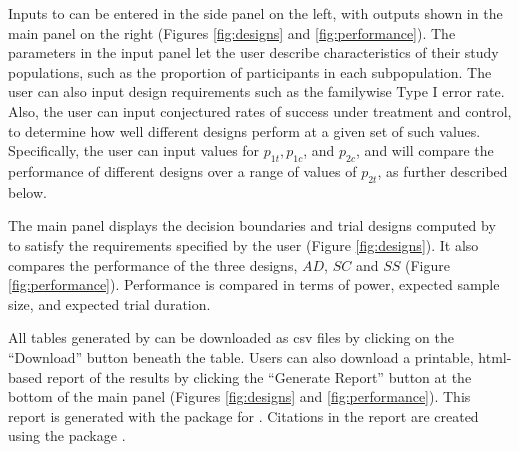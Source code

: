 \documentclass[article]{jss}
\begin{document}
Inputs to  can be entered in the side panel on the left, with outputs shown in the main panel on the right (Figures \ref{fig:designs} and \ref{fig:performance}). The parameters in the input panel let the user describe characteristics of their study populations, such as the proportion of participants in each subpopulation. 
The user can also input design requirements such as  the  familywise Type I error rate. Also, the user can input conjectured rates of success under treatment and control, to determine how well different designs perform at a given set of such values. Specifically, the user can input values for $p_{1t},p_{1c}$, and $p_{2c}$, and   will compare the performance of different designs  over a range of values of $p_{2t}$, as further described below.

The main panel displays the decision boundaries and trial designs  computed by  to satisfy the requirements specified by the user  (Figure \ref{fig:designs}). It also compares the performance of the three designs, $AD$, $SC$ and $SS$ (Figure \ref{fig:performance}). Performance is compared in terms of power, expected sample size, and expected trial duration.

All tables generated by  can be downloaded as csv files by clicking on the ``Download'' button beneath the table. Users can also download a printable, html-based report of the results by clicking the ``Generate Report'' button at the bottom of the main panel (Figures \ref{fig:designs} and \ref{fig:performance}). This report is generated with the  package for  \citep{knitr}. Citations in the report are created using the  package \citep{knitcitations}.
\end{document}
